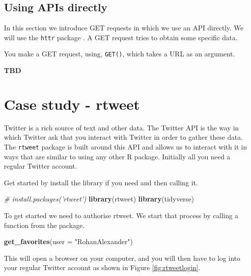 \documentclass[
]{book}
\newenvironment{Shaded}{\begin{snugshade}}{\end{snugshade}}
\newcommand{\CommentTok}[1]{\textcolor[rgb]{0.56,0.35,0.01}{\textit{#1}}}
\newcommand{\DataTypeTok}[1]{\textcolor[rgb]{0.13,0.29,0.53}{#1}}
\newcommand{\KeywordTok}[1]{\textcolor[rgb]{0.13,0.29,0.53}{\textbf{#1}}}
\newcommand{\NormalTok}[1]{#1}
\newcommand{\StringTok}[1]{\textcolor[rgb]{0.31,0.60,0.02}{#1}}
\begin{document}
\hypertarget{using-apis-directly}{%
\subsection{Using APIs directly}\label{using-apis-directly}}

In this section we introduce GET requests in which we use an API directly. We will use the \texttt{httr} package \citet{citehttr}. A GET request tries to obtain some specific data.

You make a GET request, using, \texttt{GET()}, which takes a URL as an argument.

\textbf{TBD}

\hypertarget{case-study---rtweet}{%
\section{Case study - rtweet}\label{case-study---rtweet}}

Twitter is a rich source of text and other data. The Twitter API is the way in which Twitter ask that you interact with Twitter in order to gather these data. The \texttt{rtweet} package \citep{rtweet-package} is built around this API and allows us to interact with it in ways that are similar to using any other R package. Initially all you need a regular Twitter account.

Get started by install the library if you need and then calling it.

\begin{Shaded}
\begin{Highlighting}[]
\CommentTok{# install.packages('rtweet')}
\KeywordTok{library}\NormalTok{(rtweet)}
\KeywordTok{library}\NormalTok{(tidyverse)}
\end{Highlighting}
\end{Shaded}

To get started we need to authorise rtweet. We start that process by calling a function from the package.

\begin{Shaded}
\begin{Highlighting}[]
\KeywordTok{get_favorites}\NormalTok{(}\DataTypeTok{user =} \StringTok{"RohanAlexander"}\NormalTok{)}
\end{Highlighting}
\end{Shaded}

This will open a browser on your computer, and you will then have to log into your regular Twitter account as shown in Figure \ref{fig:rtweetlogin}.
\end{document}
